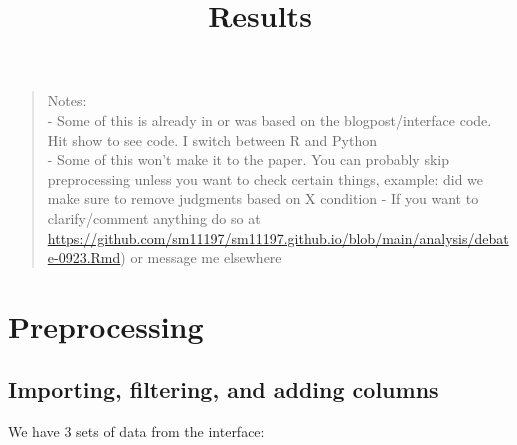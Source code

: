 \documentclass[
]{article}
\title{Results}
\author{}
\date{\vspace{-2.5em}}
\begin{document}
\maketitle

\begin{quote}
Notes:\\
- Some of this is already in or was based on the blogpost/interface
code. Hit show to see code. I switch between R and Python\\
- Some of this won't make it to the paper. You can probably skip
preprocessing unless you want to check certain things, example: did we
make sure to remove judgments based on X condition - If you want to
clarify/comment anything do so at
\url{https://github.com/sm11197/sm11197.github.io/blob/main/analysis/debate-0923.Rmd})
or message me elsewhere
\end{quote}

\section{Preprocessing}\label{preprocessing}

\subsection{Importing, filtering, and adding
columns}\label{importing-filtering-and-adding-columns}

We have 3 sets of data from the interface:
\end{document}
